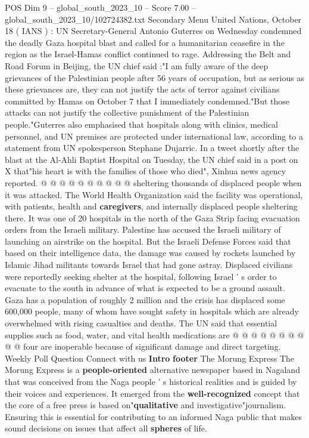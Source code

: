 \begin{textsample}{POS Dim 9 – global\_south\_2023\_10 – Score 7.00 – global\_south\_2023\_10/102724382.txt}  \label{ex:f9_pos_033}
Secondary Menu United Nations, October 18 ( IANS ) : UN Secretary-General Antonio Guterres on Wednesday condemned the deadly Gaza hospital blast and called for a humanitarian ceasefire in the region as the Israel-Hamas conflict continued to rage.
Addressing the Belt and Road Forum in Beijing, the UN chief said :"I am fully aware of the deep grievances of the Palestinian people after 56 years of occupation, but as serious as these grievances are, they can not justify the acts of terror against civilians committed by Hamas on October 7 that I immediately condemned."But those attacks can not justify the collective punishment of the Palestinian people."Guterres also emphasised that hospitals along with clinics, medical personnel, and UN premises are protected under international law, according to a statement from UN spokesperson Stephane Dujarric.
In a tweet shortly after the blast at the Al-Ahli Baptist Hospital on Tuesday, the UN chief said in a post on X that"his heart is with the families of those who died", Xinhua news agency reported. @ @ @ @ @ @ @ @ @ @ sheltering thousands of displaced people when it was attacked.
The World Health Organization said the facility was operational, with patients, health and \textbf{caregivers}, and internally displaced people sheltering there.
It was one of 20 hospitals in the north of the Gaza Strip facing evacuation orders from the Israeli military.
Palestine has accused the Israeli military of launching an airstrike on the hospital.
But the Israeli Defense Forces said that based on their intelligence data, the damage was caused by rockets launched by Islamic Jihad militants towards Israel that had gone astray.
Displaced civilians were reportedly seeking shelter at the hospital, following Israel ' s order to evacuate to the south in advance of what is expected to be a ground assault.
Gaza has a population of roughly 2 million and the crisis has displaced some 600,000 people, many of whom have sought safety in hospitals which are already overwhelmed with rising casualties and deaths.
The UN said that essential supplies such as food, water, and vital health medications are @ @ @ @ @ @ @ @ @ @ four are inoperable because of significant damage and direct targeting.
Weekly Poll Question Connect with us \textbf{Intro} \textbf{footer} The Morung Express The Morung Express is a \textbf{people-oriented} alternative newspaper based in Nagaland that was conceived from the Naga people ' s historical realities and is guided by their voices and experiences.
It emerged from the \textbf{well-recognized} concept that the core of a free press is based on"\textbf{qualitative} and investigative"journalism.
Ensuring this is essential for contributing to an informed Naga public that makes sound decisions on issues that affect all \textbf{spheres} of life.

\end{textsample}

